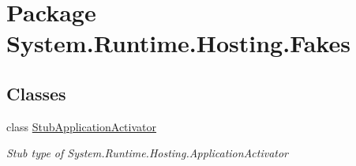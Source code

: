 \hypertarget{namespace_system_1_1_runtime_1_1_hosting_1_1_fakes}{\section{Package System.\-Runtime.\-Hosting.\-Fakes}
\label{namespace_system_1_1_runtime_1_1_hosting_1_1_fakes}
}
\subsection*{Classes}
\begin{DoxyCompactItemize}
\item 
class \hyperlink{class_system_1_1_runtime_1_1_hosting_1_1_fakes_1_1_stub_application_activator}{Stub\-Application\-Activator}
\begin{DoxyCompactList}\small\item\em Stub type of System.\-Runtime.\-Hosting.\-Application\-Activator\end{DoxyCompactList}\end{DoxyCompactItemize}
